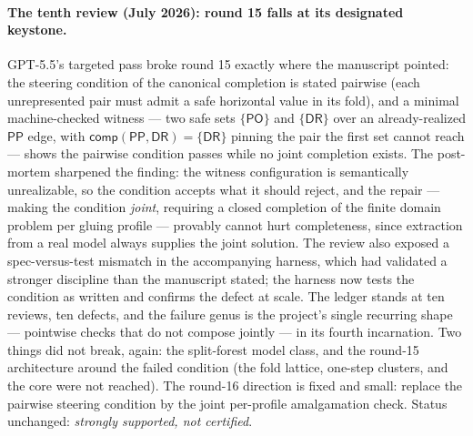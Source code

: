 \documentclass[
]{ceurart}
\theoremstyle{definition}
\newcommand{\DR}{\ensuremath{\mathsf{DR}}}
\newcommand{\PO}{\ensuremath{\mathsf{PO}}}
\newcommand{\PP}{\ensuremath{\mathsf{PP}}}
\newcommand{\comp}{\ensuremath{\mathsf{comp}}}
\begin{document}
\paragraph{The tenth review (July 2026): round 15 falls at its designated
keystone.}
GPT-5.5's targeted pass broke round 15 exactly where the manuscript
pointed: the steering condition of the canonical completion is stated
pairwise (each unrepresented pair must admit a safe horizontal value in
its fold), and a minimal machine-checked witness --- two safe sets
$\{\PO\}$ and $\{\DR\}$ over an already-realized $\PP$ edge, with
$\comp(\PP,\DR)=\{\DR\}$ pinning the pair the first set cannot reach ---
shows the pairwise condition passes while no joint completion exists.
The post-mortem sharpened the finding: the witness configuration is
semantically unrealizable, so the condition accepts what it should
reject, and the repair --- making the condition \emph{joint}, requiring
a closed completion of the finite domain problem per gluing profile ---
provably cannot hurt completeness, since extraction from a real model
always supplies the joint solution.  The review also exposed a
spec-versus-test mismatch in the accompanying harness, which had
validated a stronger discipline than the manuscript stated; the harness
now tests the condition as written and confirms the defect at scale.
The ledger stands at ten reviews, ten defects, and the failure genus is
the project's single recurring shape --- pointwise checks that do not
compose jointly --- in its fourth incarnation.  Two things did not
break, again: the split-forest model class, and the round-15
architecture around the failed condition (the fold lattice, one-step
clusters, and the core were not reached).  The round-16 direction is
fixed and small: replace the pairwise steering condition by the joint
per-profile amalgamation check.  Status unchanged: \emph{strongly
supported, not certified}.
\end{document}
